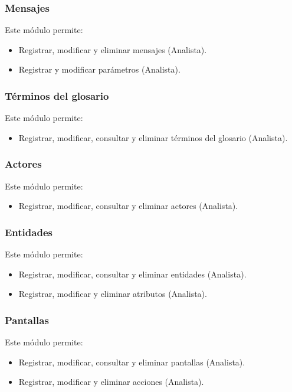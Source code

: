\subsubsection{Mensajes}
	Este módulo permite:
	\begin{itemize}
		\item Registrar, modificar y eliminar mensajes (Analista). 
		\item Registrar y modificar parámetros (Analista). 
	\end{itemize}
	
\subsubsection{Términos del glosario}
	Este módulo permite:
	\begin{itemize}
		\item Registrar, modificar, consultar y eliminar términos del glosario (Analista). 
	\end{itemize}
	
\subsubsection{Actores}
	Este módulo permite:
	\begin{itemize}
		\item Registrar, modificar, consultar y eliminar actores (Analista).
	\end{itemize}
	
\subsubsection{Entidades}
	Este módulo permite:
	\begin{itemize}
		\item Registrar, modificar, consultar y eliminar entidades (Analista).
		\item Registrar, modificar y eliminar atributos (Analista).
	\end{itemize}
	
\subsubsection{Pantallas}
	Este módulo permite:
	\begin{itemize}
		\item Registrar, modificar, consultar y eliminar pantallas (Analista).
		\item Registrar, modificar y eliminar acciones (Analista).
	\end{itemize}
	
